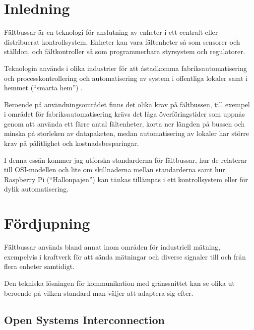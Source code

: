 \documentclass[a4paper,12pt]{article}
\begin{document}
\maketitle
{}
\thispagestyle{empty}
\clearpage


\begin{multicols}{2}

\section{Inledning}

Fältbussar är en teknologi för anslutning av enheter i ett centralt eller distribuerat kontrollsystem. Enheter kan vara fältenheter så som sensorer och ställdon, och fältkontroller så som programmerbara styrsystem och regulatorer.

Teknologin används i olika industrier för att åstadkomma fabriksautomatisering och processkontrollering och automatisering av system i offentliga lokaler samt i hemmet (\enquote{smarta hem}) \cite[s. 22-25]{distributedfieldbuscontrolnetworksystems}.

Beroende på användningsområdet finns det olika krav på fältbussen, till exempel i området för fabriksautomatisering krävs det låga överföringstider som uppnås genom att använda ett färre antal fältenheter, korta ner längden på bussen och minska på storleken av datapaketen, medan automatisering av lokaler har större krav på pålitlighet och kostnadsbesparingar.

I denna essän kommer jag utforska standarderna för fältbussar, hur de relaterar till OSI-modellen och lite om skillnaderna mellan standarderna samt hur Raspberry Pi (\enquote{Hallonpajen}) kan tänkas tillämpas i ett kontrollsystem eller för dylik automatisering.

\section{Fördjupning}

Fältbussar används bland annat inom områden för industriell mätning, exempelvis i kraftverk för att sända mätningar och diverse signaler till och från flera enheter samtidigt.

Den tekniska lösningen för kommunikation med gränssnittet kan se olika ut beroende på vilken standard man väljer att adaptera sig efter.

\subsection{Open Systems Interconnection}


\end{multicols}
\end{document}
